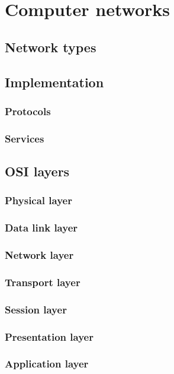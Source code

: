 \chapter{Computer networks}\label{chapter:computer-networks}

\section{Network types}

\section{Implementation}

\subsection{Protocols}

\subsection{Services}


\section{OSI layers}

\subsection{Physical layer}
\subsection{Data link layer}
\subsection{Network layer}
\subsection{Transport layer}
\subsection{Session layer}
\subsection{Presentation layer}
\subsection{Application layer}

